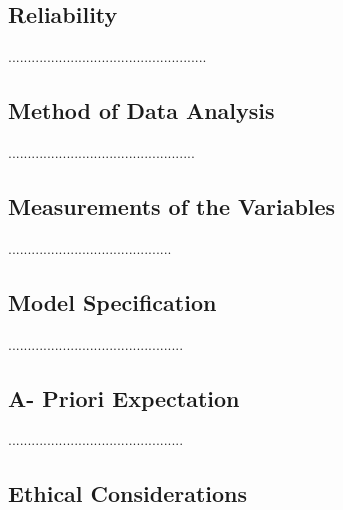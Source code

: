 \subsection{Reliability}
...................................................
\subsection{Method of Data Analysis}
................................................
\subsection{Measurements of the Variables}
..........................................
\subsection{Model Specification}
.............................................
\subsection{A- Priori Expectation}
.............................................
\subsection{Ethical Considerations}
